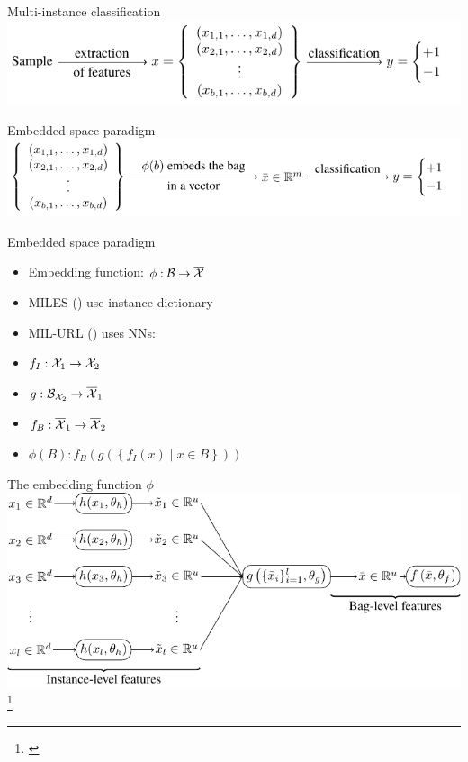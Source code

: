 \documentclass[10pt]{beamer}
\newcommand{\mathspace}{\ensuremath{\mathcal}}
\begin{document}
\begin{frame}{Multi-instance classification}
	\centering
	\includegraphics{images/multi_instance_learning/multi_instance_learning.pdf}
\end{frame}

\begin{frame}{Embedded space paradigm}
	\centering
	\includegraphics[width=0.9\pagewidth]{images/embedded_space_paradigm/embedded_space_paradigm.pdf}
\end{frame}

\begin{frame}{Embedded space paradigm}
	\begin{itemize}
		\item Embedding function: \( \phi : \mathspace{B} \to \overline{\mathspace{X}} \)
		\item MILES (\cite{chen_miles:_2006}) use instance dictionary
		\item MIL-URL (\cite{pevny_nested_2020}) uses NNs:
		\item \( f_I : \mathspace{X}_1 \to \mathspace{X}_2 \)
		\item \( g : \mathspace{B}_{\mathspace{X}_2} \to \overline{\mathspace{X}}_1 \)
		\item \( f_B : \overline{\mathspace{X}}_1\to \overline{\mathspace{X}}_2 \)
		\item \( \phi \left( B \right) : f_B \left( g \left( \left\{ f_I \left( x \right) \middle| x \in B \right\} \right) \right) \)
	\end{itemize}
\end{frame}

\begin{frame}{The embedding function \( \phi \)}
	\centering
	\includegraphics[width=0.9\pagewidth]{images/embedding_function/embedding_function.pdf}\footnote{\cite{pevny_using_2017}}
\end{frame}
\end{document}
